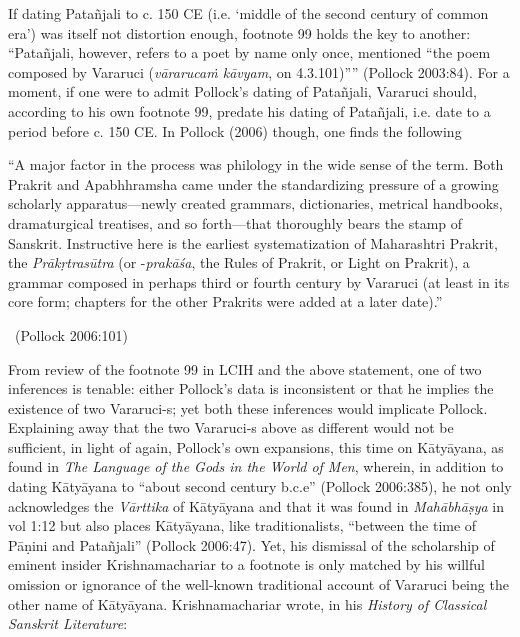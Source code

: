 If dating Patañjali to c. 150 CE (i.e. ‘middle of the second century of common era’) was itself not distortion enough, footnote 99 holds the key to another: “Patañjali, however, refers to a poet by name only once, mentioned “the poem composed by Vararuci (\textit{vārarucaṁ kāvyam}, on 4.3.101)”” (Pollock 2003:84). For a moment, if one were to admit Pollock’s dating of Patañjali, Vararuci should, according to his own footnote 99, predate his dating of Patañjali, i.e. date to a period before c. 150 CE. In Pollock (2006) though, one finds the following

\begin{myquote}
“A major factor in the process was philology in the wide sense of the term. Both Prakrit and Apabhhramsha came under the standardizing pressure of a growing scholarly apparatus—newly created grammars, dictionaries, metrical handbooks, dramaturgical treatises, and so forth—that thoroughly bears the stamp of Sanskrit. Instructive here is the earliest systematization of Maharashtri Prakrit, the \textit{Prākṛtrasūtra} (or -\textit{prakāśa}, the Rules of Prakrit, or Light on Prakrit), a grammar composed in perhaps third or fourth century by Vararuci (at least in its core form; chapters for the other Prakrits were added at a later date).” 

~\hfill (Pollock 2006:101)
\end{myquote}

From review of the footnote 99 in LCIH and the above statement, one of two inferences is tenable: either Pollock’s data is inconsistent or that he implies the existence of two Vararuci-s; yet both these inferences would implicate Pollock. Explaining away that the two Vararuci-s above as different would not be sufficient, in light of again, Pollock’s own expansions, this time on Kātyāyana, as found in \textit{The Language of the Gods in the World of Men}, wherein, in addition to dating Kātyāyana to “about second century b.c.e” (Pollock 2006:385), he not only acknowledges the \textit{Vārttika} of Kātyāyana and that it was found in \textit{Mahābhāṣya} in vol 1:12 but also places Kātyāyana, like traditionalists, “between the time of Pāṇini and Patañjali” (Pollock 2006:47). Yet, his dismissal of the scholarship of eminent insider Krishnamachariar to a footnote is only matched by his willful omission or ignorance of the well-known traditional account of Vararuci being the other name of Kātyāyana. Krishnamachariar wrote, in his \textit{History of Classical Sanskrit Literature}:

